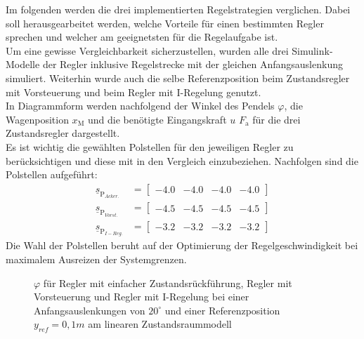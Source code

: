 Im folgenden werden die drei implementierten Regelstrategien verglichen. Dabei soll herausgearbeitet werden, welche Vorteile für einen bestimmten Regler sprechen und welcher am geeignetsten für die Regelaufgabe ist. \\
Um eine gewisse Vergleichbarkeit sicherzustellen, wurden alle drei Simulink-Modelle der Regler inklusive Regelstrecke mit der gleichen Anfangsauslenkung simuliert. Weiterhin wurde auch die selbe Referenzposition beim Zustandsregler mit Vorsteuerung und beim Regler mit I-Regelung genutzt. \\
In Diagrammform werden nachfolgend der Winkel des Pendels $\varphi$, die Wagenposition $x_{\mathrm{M}}$ und die benötigte Eingangskraft $u$ \bzw $F_{\mathrm{a}}$ für die drei Zustandsregler dargestellt. \\
Es ist wichtig die gewählten Polstellen für den jeweiligen Regler zu berücksichtigen und diese mit in den Vergleich einzubeziehen. Nachfolgen sind die Polstellen aufgeführt:
\begin{align*}
    \underline{s}_{\mathrm{P}_{Acker.}} &= 
    \begin{bmatrix}
        -4.0 & -4.0 & -4.0 & -4.0 
    \end{bmatrix} \\
    \underline{s}_{\mathrm{P}_{Vorst.}} &= 
    \begin{bmatrix}
        -4.5 & -4.5 & -4.5 & -4.5 
    \end{bmatrix} \\
    \underline{s}_{\mathrm{P}_{I-Reg.}} &= 
    \begin{bmatrix}
        -3.2 & -3.2 & -3.2 & -3.2 
    \end{bmatrix}
\end{align*}
\newline
Die Wahl der Polstellen beruht auf der Optimierung der Regelgeschwindigkeit bei maximalem Ausreizen der Systemgrenzen.

\begin{figure}[H]
    \centering
    \caption[Reglervergleich für $\varphi$ (linear)]{$\varphi$ für Regler mit einfacher Zustandsrückführung, Regler mit Vorsteuerung und Regler mit I-Regelung bei einer Anfangsauslenkungen von $20^\circ$ und einer Referenzposition $y_{ref} = 0,1 m$ am linearen Zustandsraummodell}
    \label{fig:Bild25}
\end{figure}

